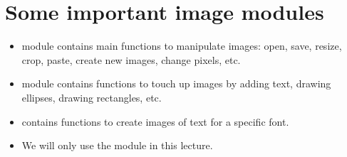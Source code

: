 \documentclass[letterpaper,10pt,english]{sphinxmanual}
\begin{document}
\section{Some important image modules}
\label{\detokenize{lecture_notes/lec07_modules_images:some-important-image-modules}}\begin{itemize}
\item {} 
 module contains main functions to manipulate images: open,
save, resize, crop, paste, create new images, change pixels, etc.

\item {} 
 module contains functions to touch up images by adding
text, drawing ellipses, drawing rectangles, etc.

\item {} 
 contains functions to create images of text for a
specific font.

\item {} 
We will only use the  module in this lecture.

\end{itemize}
\end{document}
